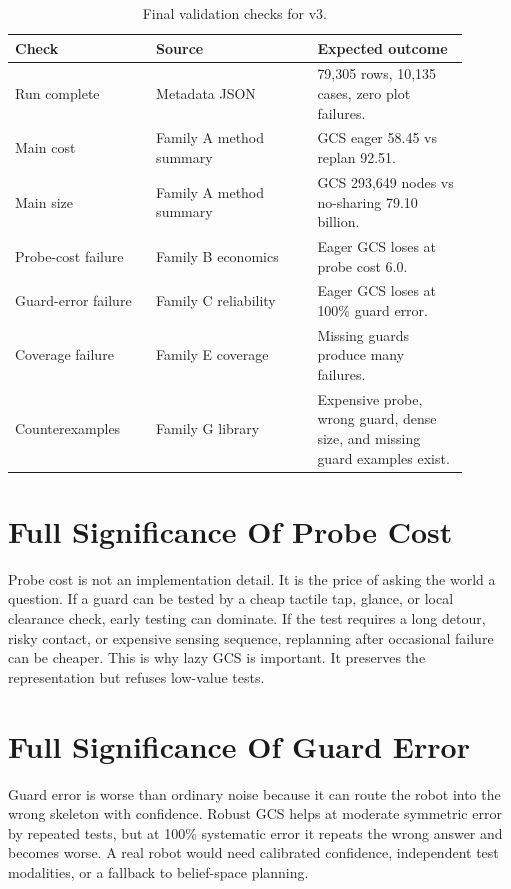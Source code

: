 \documentclass{article}
\begin{document}
\begin{table}[p]
\centering
\caption{Final validation checks for v3.}
\label{tab:validation}
\small
\begin{tabular}{p{0.28\linewidth}p{0.32\linewidth}p{0.30\linewidth}}
\toprule
Check & Source & Expected outcome \\
\midrule
Run complete & Metadata JSON & 79,305 rows, 10,135 cases, zero plot failures.\\
Main cost & Family A method summary & GCS eager 58.45 vs replan 92.51.\\
Main size & Family A method summary & GCS 293,649 nodes vs no-sharing 79.10 billion.\\
Probe-cost failure & Family B economics & Eager GCS loses at probe cost 6.0.\\
Guard-error failure & Family C reliability & Eager GCS loses at 100\% guard error.\\
Coverage failure & Family E coverage & Missing guards produce many failures.\\
Counterexamples & Family G library & Expensive probe, wrong guard, dense size, and missing guard examples exist.\\
\bottomrule
\end{tabular}
\end{table}

\section{Full Significance Of Probe Cost}
Probe cost is not an implementation detail. It is the price of asking the world a question. If a guard can be tested by a cheap tactile tap, glance, or local clearance check, early testing can dominate. If the test requires a long detour, risky contact, or expensive sensing sequence, replanning after occasional failure can be cheaper. This is why lazy GCS is important. It preserves the representation but refuses low-value tests.

\section{Full Significance Of Guard Error}
Guard error is worse than ordinary noise because it can route the robot into the wrong skeleton with confidence. Robust GCS helps at moderate symmetric error by repeated tests, but at 100\% systematic error it repeats the wrong answer and becomes worse. A real robot would need calibrated confidence, independent test modalities, or a fallback to belief-space planning.
\end{document}
